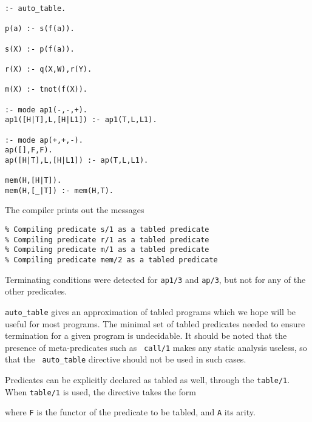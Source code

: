 \begin{center}
\begin{verbatim}
:- auto_table. 

p(a) :- s(f(a)). 

s(X) :- p(f(a)).

r(X) :- q(X,W),r(Y).

m(X) :- tnot(f(X)).

:- mode ap1(-,-,+).
ap1([H|T],L,[H|L1]) :- ap1(T,L,L1).

:- mode ap(+,+,-).
ap([],F,F).
ap([H|T],L,[H|L1]) :- ap(T,L,L1).

mem(H,[H|T]).
mem(H,[_|T]) :- mem(H,T).
\end{verbatim}
\end{center}

\noindent
The compiler prints out the messages
\begin{verbatim}
% Compiling predicate s/1 as a tabled predicate
% Compiling predicate r/1 as a tabled predicate
% Compiling predicate m/1 as a tabled predicate
% Compiling predicate mem/2 as a tabled predicate
\end{verbatim}

Terminating conditions were detected for {\tt ap1/3} and {\tt ap/3}, but
not for any of the other predicates.

{\tt auto\_table} gives an approximation of tabled programs which we
hope will be useful for most programs.  The minimal set of tabled
predicates needed to ensure termination for a given program is
undecidable.  
It should be noted that the presence of meta-predicates such as {\tt
call/1} makes any static analysis useless, so that the {\tt
auto\_table} directive should not be used in such cases.

Predicates can be explicitly declared as tabled as well, through the
{\tt table/1}.  When {\tt table/1} is used, the directive takes the
form


\noindent
where {\tt F} is the functor of the predicate to be tabled, and {\tt A} its
arity.  


